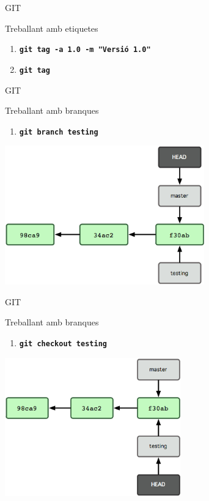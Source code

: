 \documentclass[10pt,xcolor={rgb}]{beamer}
\begin{document}
    \begin{frame}[fragile]{GIT}
      \begin{block}{Treballant amb etiquetes}

        \begin{enumerate}
          \item \texttt{\textbf{git tag -a 1.0 -m "Versió 1.0"}}
          \item \texttt{\textbf{git tag}}
        \end{enumerate}

        

      \end{block}
    \end{frame}

    \begin{frame}[fragile]{GIT}
      \begin{block}{Treballant amb branques}

        \begin{enumerate}
          \item \texttt{\textbf{git branch testing}}
        \end{enumerate}

        \centering
        \includegraphics[height=6cm]{b1.png}

      \end{block}
    \end{frame}

    \begin{frame}[fragile]{GIT}
      \begin{block}{Treballant amb branques}

        \begin{enumerate}
          \item \texttt{\textbf{git checkout testing}}
        \end{enumerate}

        \centering
        \includegraphics[height=6cm]{b2.png}

      \end{block}
    \end{frame}
\end{document}
